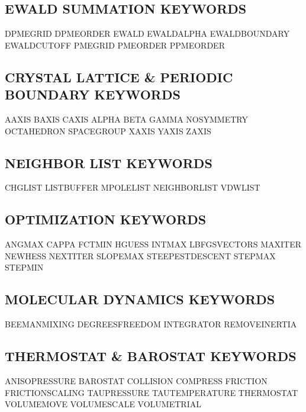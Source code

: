 \documentclass[letterpaper,11pt,english]{sphinxmanual}
\begin{document}
\subsection{EWALD SUMMATION KEYWORDS}
\label{\detokenize{text/keywords:ewald-summation-keywords}}
DPME\sphinxhyphen{}GRID       DPME\sphinxhyphen{}ORDER      EWALD
EWALD\sphinxhyphen{}ALPHA     EWALD\sphinxhyphen{}BOUNDARY  EWALD\sphinxhyphen{}CUTOFF
PME\sphinxhyphen{}GRID        PME\sphinxhyphen{}ORDER       PPME\sphinxhyphen{}ORDER


\subsection{CRYSTAL LATTICE \& PERIODIC BOUNDARY KEYWORDS}
\label{\detokenize{text/keywords:crystal-lattice-periodic-boundary-keywords}}
A\sphinxhyphen{}AXIS  B\sphinxhyphen{}AXIS  C\sphinxhyphen{}AXIS
ALPHA   BETA    GAMMA
NO\sphinxhyphen{}SYMMETRY     OCTAHEDRON      SPACEGROUP
X\sphinxhyphen{}AXIS  Y\sphinxhyphen{}AXIS  Z\sphinxhyphen{}AXIS


\subsection{NEIGHBOR LIST KEYWORDS}
\label{\detokenize{text/keywords:neighbor-list-keywords}}
CHG\sphinxhyphen{}LIST        LIST\sphinxhyphen{}BUFFER     MPOLE\sphinxhyphen{}LIST
NEIGHBOR\sphinxhyphen{}LIST   VDW\sphinxhyphen{}LIST


\subsection{OPTIMIZATION KEYWORDS}
\label{\detokenize{text/keywords:optimization-keywords}}
ANGMAX  CAPPA   FCTMIN
HGUESS  INTMAX  LBFGS\sphinxhyphen{}VECTORS
MAXITER NEWHESS NEXTITER
SLOPEMAX        STEEPEST\sphinxhyphen{}DESCENT        STEPMAX
STEPMIN


\subsection{MOLECULAR DYNAMICS KEYWORDS}
\label{\detokenize{text/keywords:molecular-dynamics-keywords}}
BEEMAN\sphinxhyphen{}MIXING   DEGREES\sphinxhyphen{}FREEDOM INTEGRATOR
REMOVE\sphinxhyphen{}INERTIA


\subsection{THERMOSTAT \& BAROSTAT KEYWORDS}
\label{\detokenize{text/keywords:thermostat-barostat-keywords}}
ANISO\sphinxhyphen{}PRESSURE  BAROSTAT        COLLISION
COMPRESS        FRICTION        FRICTION\sphinxhyphen{}SCALING
TAU\sphinxhyphen{}PRESSURE    TAU\sphinxhyphen{}TEMPERATURE THERMOSTAT
VOLUME\sphinxhyphen{}MOVE     VOLUME\sphinxhyphen{}SCALE    VOLUME\sphinxhyphen{}TRIAL
\end{document}
